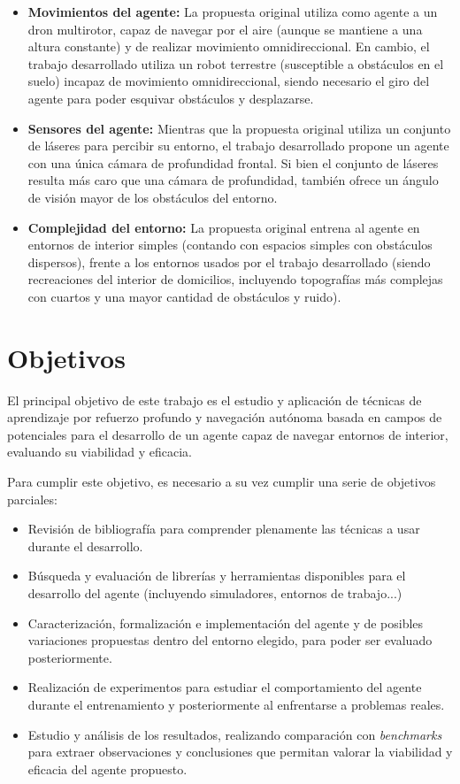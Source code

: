 \begin{itemize}
	\item \textbf{Movimientos del agente:} La propuesta original utiliza como agente a un dron multirotor, capaz de navegar por el aire (aunque se mantiene a una altura constante) y de realizar movimiento omnidireccional. En cambio, el trabajo desarrollado utiliza un robot terrestre (susceptible a obstáculos en el suelo) incapaz de movimiento omnidireccional, siendo necesario el giro del agente para poder esquivar obstáculos y desplazarse.
	\item \textbf{Sensores del agente:} Mientras que la propuesta original utiliza un conjunto de láseres para percibir su entorno, el trabajo desarrollado propone un agente con una única cámara de profundidad frontal. Si bien el conjunto de láseres resulta más caro que una cámara de profundidad, también ofrece un ángulo de visión mayor de los obstáculos del entorno.
	\item \textbf{Complejidad del entorno:} La propuesta original entrena al agente en entornos de interior simples (contando con espacios simples con obstáculos dispersos), frente a los entornos usados por el trabajo desarrollado (siendo recreaciones del interior de domicilios, incluyendo topografías más complejas con cuartos y una mayor cantidad de obstáculos y ruido).
\end{itemize}

\section{Objetivos}

El principal objetivo de este trabajo es el estudio y aplicación de técnicas de aprendizaje por refuerzo profundo y navegación autónoma basada en campos de potenciales para el desarrollo de un agente capaz de navegar entornos de interior, evaluando su viabilidad y eficacia.

Para cumplir este objetivo, es necesario a su vez cumplir una serie de objetivos parciales:

\begin{itemize}
	\item Revisión de bibliografía para comprender plenamente las técnicas a usar durante el desarrollo.
	\item Búsqueda y evaluación de librerías y herramientas disponibles para el desarrollo del agente (incluyendo simuladores, entornos de trabajo...)
	\item Caracterización, formalización e implementación del agente y de posibles variaciones propuestas dentro del entorno elegido, para poder ser evaluado posteriormente.
	\item Realización de experimentos para estudiar el comportamiento del agente durante el entrenamiento y posteriormente al enfrentarse a problemas reales.
	\item Estudio y análisis de los resultados, realizando comparación con \textit{benchmarks} para extraer observaciones y conclusiones que permitan valorar la viabilidad y eficacia del agente propuesto.
\end{itemize}

